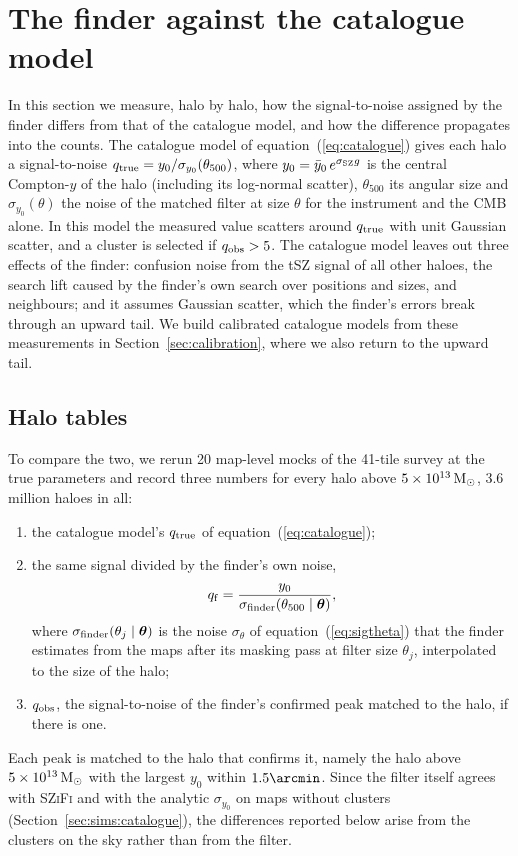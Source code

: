 \section{The finder against the catalogue model}\label{sec:finder}

In this section we measure, halo by halo, how the signal-to-noise assigned by the finder differs from that of
the catalogue model, and how the difference propagates into the counts. The catalogue model of
equation~(\ref{eq:catalogue}) gives each halo a signal-to-noise $q_\mathrm{true} = y_0/\sigma_{y_0}(\theta_{500})$,
where $y_0 = \bar y_0\,e^{\sigma_\mathrm{SZ} g}$ is the central Compton-$y$ of the halo (including its log-normal scatter),
$\theta_{500}$ its angular size and $\sigma_{y_0}(\theta)$ the noise of the matched filter at size $\theta$ for
the instrument and the CMB alone. In this model the measured value scatters around $q_\mathrm{true}$ with unit Gaussian
scatter, and a cluster is selected if $q_\mathrm{obs} > 5$. The catalogue model leaves out three effects of the
finder: confusion noise from the tSZ signal of all other haloes, the search lift caused by the finder's own
search over positions and sizes, and neighbours; and it assumes Gaussian scatter, which the finder's errors
break through an upward tail. We build calibrated catalogue models from these measurements in
Section~\ref{sec:calibration}, where we also return to the upward tail.

\subsection{Halo tables}\label{sec:finder_tables}

To compare the two, we rerun 20 map-level mocks of the 41-tile survey at the true parameters and record
three numbers for every halo above $5\times10^{13}\,\mathrm{M}_\odot$, 3.6 million haloes in all:
\begin{enumerate}
\item the catalogue model's $q_\mathrm{true}$ of equation~(\ref{eq:catalogue});
\item the same signal divided by the finder's own noise,
\begin{equation}
q_\mathrm{f} = \frac{y_0}{\sigma_\mathrm{finder}(\theta_{500}\mid\bm\theta)},
\label{eq:q_finder_noise}
\end{equation}
where $\sigma_\mathrm{finder}(\theta_j\mid\bm\theta)$ is the noise $\sigma_\theta$ of equation~(\ref{eq:sigtheta}) that the finder
estimates from the maps after its masking pass at filter size $\theta_j$, interpolated to the size of the halo;
\item $q_\mathrm{obs}$, the signal-to-noise of the finder's confirmed peak matched to the halo, if there is one.
\end{enumerate}
Each peak is matched to the halo that confirms it, namely the halo above $5\times10^{13}\,\mathrm{M}_\odot$ with the
largest $y_0$ within $1.5\arcmin$. Since the filter itself agrees with \textsc{SZiFi} and with the analytic
$\sigma_{y_0}$ on maps without clusters (Section~\ref{sec:sims:catalogue}), the differences reported below
arise from the clusters on the sky rather than from the filter.

